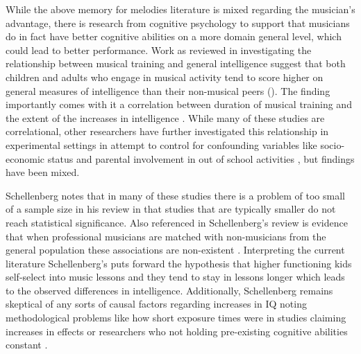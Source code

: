 \documentclass[]{book}
\begin{document}
While the above memory for melodies literature is mixed regarding the musician's advantage, there is research from cognitive psychology to support that musicians do in fact have better cognitive abilities on a more domain general level, which could lead to better performance.
Work as reviewed in \citet{schellenbergMusicNonmusicalAbilities2017} investigating the relationship between musical training and general intelligence suggest that both children and adults who engage in musical activity tend to score higher on general measures of intelligence than their non-musical peers (\citep{gibsonEnhancedDivergentThinking2009, hilleAssociationsMusicEducation2011, schellenbergExaminingAssociationMusic2011, schellenbergMusicTrainingEmotion2012}).
The finding importantly comes with it a correlation between duration of musical training and the extent of the increases in intelligence \citep{corrigallMusicTrainingCognition2013, corrigallPredictingWhoTakes2015, degeMusicLessonsIntelligence2011, schellenbergLongtermPositiveAssociations2006}.
While many of these studies are correlational, other researchers have further investigated this relationship in experimental settings in attempt to control for confounding variables like socio-economic status and parental involvement in out of school activities \citep{corrigallMusicTrainingCognition2013c, degeMusicLessonsIntelligence2011, schellenbergExaminingAssociationMusic2011, schellenbergLongtermPositiveAssociations2006, schellenbergMusicTrainingEmotion2012}, but findings have been mixed.

Schellenberg \citep{schellenbergMusicNonmusicalAbilities2017} notes that in many of these studies there is a problem of too small of a sample size in his review \citep{corrigallAssociationsLengthMusic2011, parbery-clarkMusicalExperienceAging2011, straitMusicalTrainingEarly2012} in that studies that are typically smaller do not reach statistical significance.
Also referenced in Schellenberg's review is evidence that when professional musicians are matched with non-musicians from the general population these associations are non-existent \citep{schellenbergMusicTrainingSpeech2015}.
Interpreting the current literature Schellenberg's puts forward the hypothesis that higher functioning kids self-select into music lessons and they tend to stay in lessons longer which leads to the observed differences in intelligence.
Additionally, Schellenberg remains skeptical of any sorts of causal factors regarding increases in IQ \citep{francoisMusicTrainingDevelopment2013, morenoMusicalTrainingInfluences2009} noting methodological problems like how short exposure times were in studies claiming increases in effects or researchers who not holding pre-existing cognitive abilities constant \citep{mehrTwoRandomizedTrials2013}.
\end{document}
